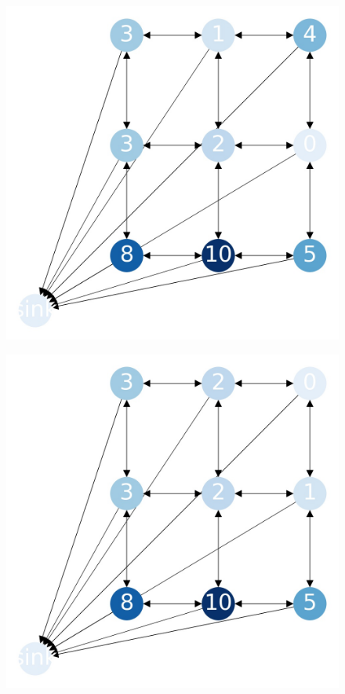 \documentclass{beamer}
\begin{document}
    \begin{frame}
      \begin{figure}[h!]
        \centering
          \includegraphics[scale=0.25]{sandpile_-16}
      \end{figure}
    \end{frame}
    

    \begin{frame}
      \begin{figure}[h!]
        \centering
          \includegraphics[scale=0.25]{sandpile_-17}
      \end{figure}
    \end{frame}
    
\end{document}
